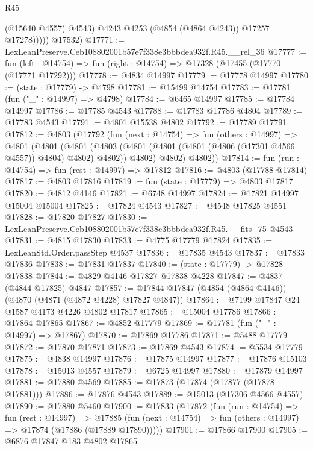 \begin{lexlean}{R45}
\begin{coremodule}
                  (@15640 @4557)
                  @4543)
                @4243
                @4253
                (@4854 (@4864 @4243))
                @17257
                @17278)))))
      @17532)
@17771 := LexLeanPreserve.Ceb108802001b57e7f338e3bbbdea932f.R45.__rel_36
@17777 := fun (left : @14754) => fun (right : @14754) => @17328 (@17455 (@17770 (@17771 @17292)))
@17778 := @4834 @14997
@17779 := @17778 @14997
@17780 := (state : @17779) -> @4798
@17781 := @15499 @14754
@17783 := @17781 (fun ("_" : @14997) => @4798)
@17784 := @6465 @14997
@17785 := @17784 @14997
@17786 := @17785 @4543
@17788 := @17783 @17786 @4804
@17789 := @17783 @4543
@17791 := @4801 @15538 @4802
@17792 := @17789 @17791
@17812 := @4803
    (@17792
      (fun (next : @14754) =>
      fun (others : @14997) =>
      @4801
        (@4801
          (@4801
            (@4803 (@4801 (@4801 (@4801 (@4806 (@17301 @4566 @4557)) @4804) @4802) @4802))
            @4802)
          @4802)
        @4802))
@17814 := fun (run : @14754) => fun (rest : @14997) => @17812
@17816 := @4803 (@17788 @17814)
@17817 := @4803 @17816
@17819 := fun (state : @17779) => @4803 @17817
@17820 := @4812 @4146
@17821 := @6748 @14997
@17824 := @17821 @14997 @15004 @15004
@17825 := @17824 @4543
@17827 := @4548 @17825 @4551
@17828 := @17820 @17827
@17830 := LexLeanPreserve.Ceb108802001b57e7f338e3bbbdea932f.R45.__fits_75 @4543
@17831 := @4815 @17830
@17833 := @4775 @17779 @17824
@17835 := LexLeanStd.Order.passStep @4537
@17836 := @17835 @4543
@17837 := @17833 @17836
@17838 := @17831 @17837
@17840 := (state : @17779) -> @17828 @17838
@17844 := @4829 @4146 @17827 @17838 @4228
@17847 := @4837 (@4844 @17825) @4847
@17857 := @17844 @17847 (@4854 (@4864 @4146)) (@4870 (@4871 (@4872 @4228) @17827 @4847))
@17864 := @7199 @17847 @24 @1587 @4173 @4226 @4802 @17817
@17865 := @15004 @17786
@17866 := @17864 @17865
@17867 := @4852 @17779
@17869 := @17781 (fun ("_" : @14997) => @17867)
@17870 := @17869 @17786
@17871 := @5488 @17779
@17872 := @17870 @17871
@17873 := @17869 @4543
@17874 := @5534 @17779
@17875 := @4838 @14997
@17876 := @17875 @14997
@17877 := @17876 @15103
@17878 := @15013 @4557
@17879 := @6725 @14997
@17880 := @17879 @14997
@17881 := @17880 @4569
@17885 := @17873 (@17874 (@17877 (@17878 @17881)))
@17886 := @17876 @4543
@17889 := @15013 (@17306 @4566 @4557)
@17890 := @17880 @5460
@17900 := @17833
    (@17872
      (fun (run : @14754) =>
      fun (rest : @14997) =>
      @17885 (fun (next : @14754) => fun (others : @14997) => @17874 (@17886 (@17889 @17890)))))
@17901 := @17866 @17900
@17905 := @6876 @17847 @183 @4802 @17865

\end{coremodule}
\end{lexlean}
